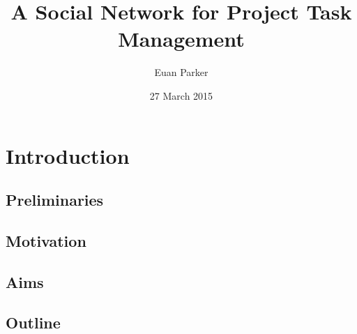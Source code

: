 \documentclass[a4paper]{l4proj}
\begin{document}
\title{A Social Network for Project Task Management}
\author{Euan Parker}
\date{27 March 2015}
\maketitle
\begin{abstract}


\end{abstract}
\educationalconsent
\tableofcontents
\chapter{Introduction}
\label{intro}

\section{Preliminaries}
\label{preliminaries}

\section{Motivation}
\label{motivation}


\section{Aims}
\label{aims}


\section{Outline}
\label{outline}

\appendix
\end{document}
